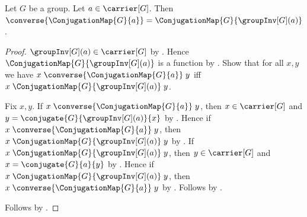 \begin{theorem}\label{conjugation_map_converse}
    Let $G$ be a group.
    Let $a\in\carrier[G]$.
    Then $\converse{\ConjugationMap{G}{a}}
        =\ConjugationMap{G}{\groupInv[G](a)}$.
\end{theorem}
\begin{proof}
    $\groupInv[G](a)\in\carrier[G]$ by
        .
    Hence $\ConjugationMap{G}{\groupInv[G](a)}$ is a function by
        .
    Show that for all $x,y$ we have
        $x\mathrel{\converse{\ConjugationMap{G}{a}}}y$ iff
        $x\mathrel{\ConjugationMap{G}{\groupInv[G](a)}}y$.
    \begin{subproof}
        Fix $x,y$.
        If $x\mathrel{\converse{\ConjugationMap{G}{a}}}y$, then
            $x\in\carrier[G]$ and
            $y=\conjugate{G}{\groupInv[G](a)}{x}$ by
            .
        Hence if $x\mathrel{\converse{\ConjugationMap{G}{a}}}y$, then
            $x\mathrel{\ConjugationMap{G}{\groupInv[G](a)}}y$ by
            .
        If $x\mathrel{\ConjugationMap{G}{\groupInv[G](a)}}y$, then
            $y\in\carrier[G]$ and $x=\conjugate{G}{a}{y}$ by
            .
        Hence if $x\mathrel{\ConjugationMap{G}{\groupInv[G](a)}}y$, then
            $x\mathrel{\converse{\ConjugationMap{G}{a}}}y$ by
            .
        Follows by \auto.
    \end{subproof}
    Follows by
        .
\end{proof}
